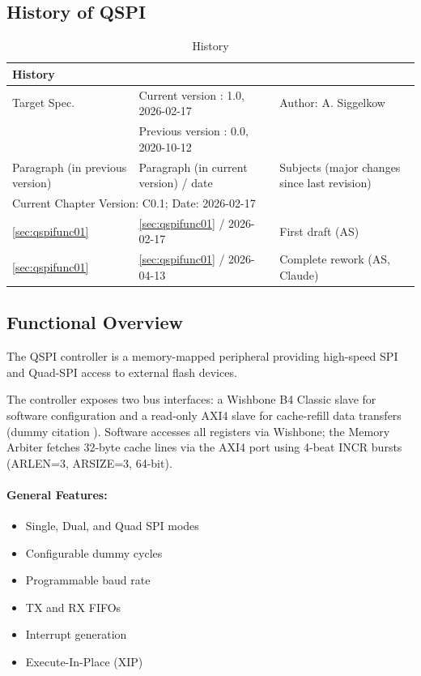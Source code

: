 \subsection{History of QSPI}
\begin{table}[H]
\caption{History}
\label{tab:qspihistory02}
\centering
\begin{tabularx}{\textwidth}{|X |X |X |}
  \hline
  \multicolumn{3}{|l|}{History} \\
  \hline
  \multicolumn{1}{|l}{Target Spec.} & \multicolumn{1}{l}{Current version : 1.0, 2026-02-17} & \multicolumn{1}{l|}{Author: A. Siggelkow}\\
  \multicolumn{1}{|l}{ } & \multicolumn{1}{l}{Previous version : 0.0, 2020-10-12} & \multicolumn{1}{l|}{ }\\
  \hline
  \hline
  Paragraph (in previous version) & Paragraph (in current version) / date & Subjects (major changes since last revision) \\
  \hline
  \hline
  \multicolumn{3}{|l|}{Current Chapter Version: C0.1; Date: 2026-02-17} \\
  \hline
  \ref{sec:qspifunc01} & \ref{sec:qspifunc01} / 2026-02-17 & First draft (AS) \\
  \hline
  \ref{sec:qspifunc01} & \ref{sec:qspifunc01} / 2026-04-13 & Complete rework (AS, Claude) \\
  \hline
\end{tabularx}
\end{table}

\subsection{Functional Overview}
\label{subsec:qspifunc01}
The QSPI controller is a memory-mapped peripheral providing high-speed SPI and Quad-SPI access to external flash devices.

The controller exposes two bus interfaces: a Wishbone B4 Classic slave for software
configuration and a read-only AXI4 slave for cache-refill data transfers (dummy citation \cite{lehm}).
Software accesses all registers via Wishbone; the Memory Arbiter fetches 32-byte cache
lines via the AXI4 port using 4-beat INCR bursts (ARLEN=3, ARSIZE=3, 64-bit).

\paragraph{General Features: }
\begin{itemize}
  \item Single, Dual, and Quad SPI modes
  \item Configurable dummy cycles
  \item Programmable baud rate
  \item TX and RX FIFOs
  \item Interrupt generation
  \item Execute-In-Place (XIP)
\end{itemize}

